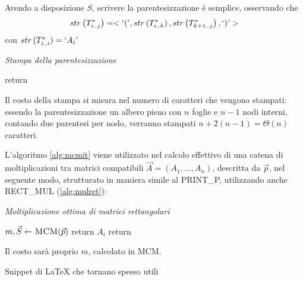 Avendo a disposizione $S$, scrivere la parentesizzazione è semplice, osservando che
\begin{equation*}
    str\left( T_{i..j}^* \right) = < `(\textrm{'} , 
    str\left( T_{i..k}^* \right) ,
    str\left( T_{k+1..j}^* \right)
    , `)\textrm{'} > 
\end{equation*}
con $str\left( T_{i..i}^* \right) = `A_i\textrm{'} $ 
\begin{algorithm}[H]
\caption{\emph{Stampa della parentesizzazione}}\label{alg:mcmprint}
\begin{algorithmic}[1]
        \State {}
        \State return
    \EndIf
    \State {}
    \State {}
    \State {}
    \State {}
\EndProcedure
\end{algorithmic}
\end{algorithm}
Il costo della stampa si misura nel numero di caratteri che vengono stampati: essendo la parentesizzazione un albero pieno con $n$ foglie e $n-1$ nodi interni, contando due parentesi per nodo, verranno stampati $n+2(n-1) = \Theta(n)$ caratteri.

L'algoritmo \ref{alg:mcmit} viene utilizzato nel calcolo effettivo di una catena di moltiplicazioni tra matrici compatibili $\vec{A}=\left( A_1, \dots, A_n \right)$, descritta da $\vec{p}$, nel seguente modo, strutturato in maniera simile al PRINT\_P, utilizzando anche RECT\_MUL (\ref{alg:mulret}):
\begin{algorithm}[H]
\caption{\emph{Moltiplicazione ottima di matrici rettangolari}}\label{alg:mcmmul}
\begin{algorithmic}[1]
    \State $m, \vec{S} \gets \Call{MCM}{\vec{p}}$
        \State return $A_i$
    \EndIf
    \State {}
    \State {}
    \State return 
\EndProcedure
\end{algorithmic}
\end{algorithm}
Il costo sarà proprio $m$, calcolato in MCM.

Snippet di \LaTeX{} che tornano spesso utili

